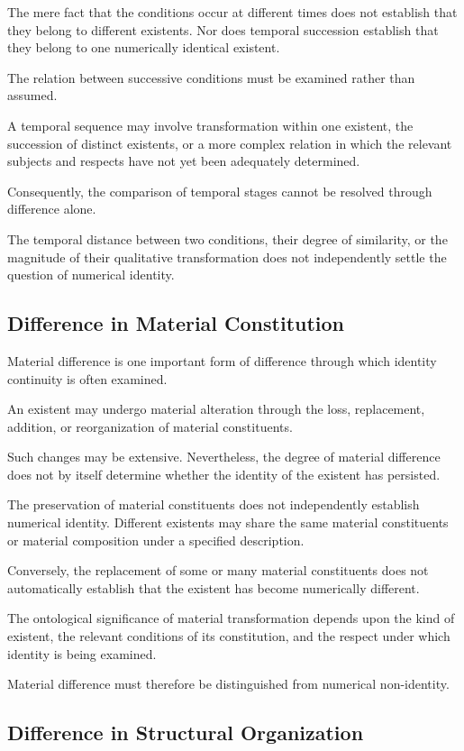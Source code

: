 The mere fact that the conditions occur at different
times does not establish that they belong to different
existents. Nor does temporal succession establish
that they belong to one numerically identical existent.

The relation between successive conditions must be
examined rather than assumed.

A temporal sequence may involve transformation within
one existent, the succession of distinct existents,
or a more complex relation in which the relevant
subjects and respects have not yet been adequately
determined.

Consequently, the comparison of temporal stages
cannot be resolved through difference alone.

The temporal distance between two conditions, their
degree of similarity, or the magnitude of their
qualitative transformation does not independently
settle the question of numerical identity.

\subsection{Difference in Material Constitution}

Material difference is one important form of difference
through which identity continuity is often examined.

An existent may undergo material alteration through
the loss, replacement, addition, or reorganization
of material constituents.

Such changes may be extensive. Nevertheless, the
degree of material difference does not by itself
determine whether the identity of the existent has
persisted.

The preservation of material constituents does not
independently establish numerical identity. Different
existents may share the same material constituents
or material composition under a specified description.

Conversely, the replacement of some or many material
constituents does not automatically establish that
the existent has become numerically different.

The ontological significance of material transformation
depends upon the kind of existent, the relevant
conditions of its constitution, and the respect
under which identity is being examined.

Material difference must therefore be distinguished
from numerical non-identity.

\subsection{Difference in Structural Organization}

